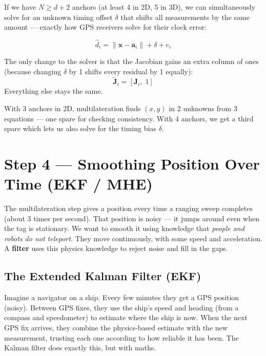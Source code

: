 \documentclass[11pt,a4paper]{article}
\newcommand{\vect}[1]{\bm{#1}}
\newcommand{\mat}[1]{\mathbf{#1}}
\begin{document}
If we have $N \geq d+2$ anchors (at least 4 in 2D, 5 in 3D), we can simultaneously solve for an unknown timing offset $\delta$ that shifts all measurements by the same amount --- exactly how GPS receivers solve for their clock error:

\begin{equation}
\hat{d}_i = \|\vect{x} - \vect{a}_i\| + \delta + e_i
\end{equation}

The only change to the solver is that the Jacobian gains an extra column of ones (because changing $\delta$ by 1 shifts every residual by 1 equally):
\begin{equation}
\tilde{\mat{J}}_i = [\mat{J}_i,\; 1]
\label{eq:jacaug}
\end{equation}
Everything else stays the same.

\begin{takeaway}
With 3 anchors in 2D, multilateration finds $(x,y)$ in 2 unknowns from 3 equations --- one spare for checking consistency. With 4 anchors, we get a third spare which lets us also solve for the timing bias $\delta$.
\end{takeaway}

\section{Step 4 --- Smoothing Position Over Time (EKF / MHE)}
\label{sec:ekf}

\begin{plain}
The multilateration step gives a position every time a ranging sweep completes (about 3 times per second). That position is noisy --- it jumps around even when the tag is stationary. We want to smooth it using knowledge that \emph{people and robots do not teleport}. They move continuously, with some speed and acceleration. A \textbf{filter} uses this physics knowledge to reject noise and fill in the gaps.
\end{plain}

\subsection{The Extended Kalman Filter (EKF)}

\begin{analogy}
Imagine a navigator on a ship. Every few minutes they get a GPS position (noisy). Between GPS fixes, they use the ship's speed and heading (from a compass and speedometer) to estimate where the ship is now. When the next GPS fix arrives, they combine the physics-based estimate with the new measurement, trusting each one according to how reliable it has been. The Kalman filter does exactly this, but with maths.
\end{analogy}
\end{document}
